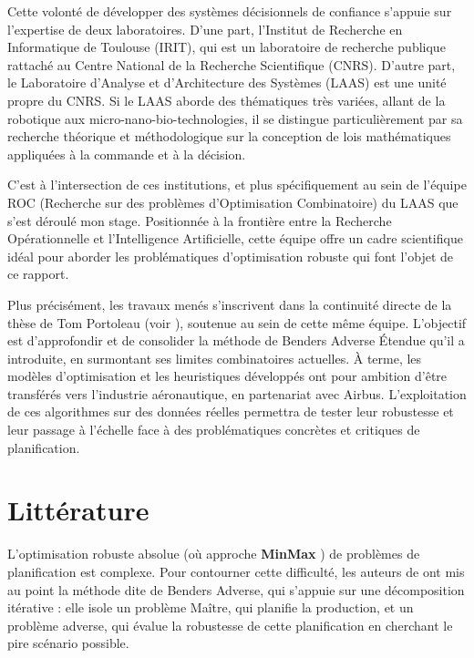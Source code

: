 \documentclass[12pt, a4paper, twoside]{article}
\numberwithin{equation}{section}
\newcommand{\mmx}{\textbf{MinMax} }
\begin{document}
	Cette volonté de développer des systèmes décisionnels de confiance s'appuie sur l'expertise de deux laboratoires. D'une part, l'Institut de Recherche en Informatique de Toulouse (IRIT), qui est un laboratoire de recherche publique rattaché au Centre National de la Recherche Scientifique (CNRS). D'autre part, le Laboratoire d'Analyse et d'Architecture des Systèmes (LAAS) est une unité propre du CNRS. Si le LAAS aborde des thématiques très variées, allant de la robotique aux micro-nano-bio-technologies, il se distingue particulièrement par sa recherche théorique et méthodologique sur la conception de lois mathématiques appliquées à la commande et à la décision.
	
	C'est à l'intersection de ces institutions, et plus spécifiquement au sein de l'équipe ROC (Recherche sur des problèmes d'Optimisation Combinatoire) du LAAS que s'est déroulé mon stage. Positionnée à la frontière entre la Recherche Opérationnelle et l'Intelligence Artificielle, cette équipe offre un cadre scientifique idéal pour aborder les problématiques d'optimisation robuste qui font l'objet de ce rapport.

    Plus précisément, les travaux menés s'inscrivent dans la continuité directe de la thèse de Tom Portoleau (voir \cite{portoleauTHESIS}), soutenue au sein de cette même équipe. L'objectif est d'approfondir et de consolider la méthode de  Benders Adverse Étendue qu'il a introduite, en surmontant ses limites combinatoires actuelles. À terme, les modèles d'optimisation et les heuristiques développés ont pour ambition d'être transférés vers l'industrie aéronautique, en partenariat avec Airbus. L'exploitation de ces algorithmes sur des données réelles permettra de tester leur robustesse et leur passage à l'échelle face à des problématiques concrètes et critiques de planification.
	
	\clearpage
	\section{Littérature}
	
	L'optimisation robuste absolue (où approche \mmx) de problèmes de planification est complexe. Pour contourner cette difficulté, les auteurs de \cite{JFBENDERS} ont mis au point la méthode dite de Benders Adverse, qui s'appuie sur une décomposition itérative : elle isole un problème Maître, qui planifie la production, et un problème adverse, qui évalue la robustesse de cette planification en cherchant le pire scénario possible.
	
\end{document}
